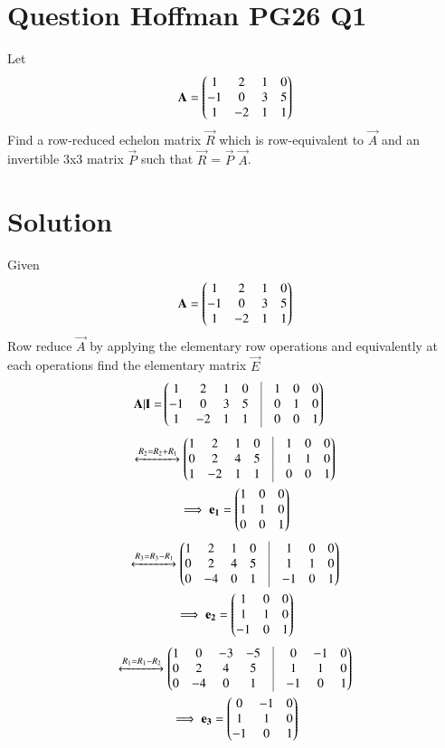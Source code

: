 \documentclass[journal,12pt,twocolumn]{IEEEtran}
\begin{document}
%
\section{Question Hoffman PG26 Q1 }
Let
\begin{align}
\mathbf{A}=\begin{pmatrix}1&2&1&0\\-1&0&3&5\\1&-2&1&1\end{pmatrix}  
\end{align}
Find a row-reduced echelon matrix $\vec{R}$ which is row-equivalent to $\vec{A}$ and an invertible 3x3 matrix $\vec{P}$ such that $\vec{R}$ = $\vec{P}$ $\vec{A}$.
\section{\textbf{Solution}}Given 
\begin{align}
\mathbf{A}=\begin{pmatrix}1&2&1&0\\-1&0&3&5\\1&-2&1&1\end{pmatrix}
\end{align}
Row reduce $\vec{A}$ by applying the elementary row operations and equivalently at each operations find the elementary matrix $\vec{E}$
\begin{align}
    \vec{A|I}=&\myvec{1&2&1&0&\vrule&1&0&0\\-1&0&3&5&\vrule&0&1&0\\1&-2&1&1&\vrule&0&0&1}
\end{align}
\begin{multline}
    \xleftrightarrow{R_2=R_2+R_1}\myvec{1&2&1&0&\vrule&1&0&0\\0&2&4&5&\vrule&1&1&0\\1&-2&1&1&\vrule&0&0&1}\\
    \implies\vec{e_1}=\myvec{1&0&0\\1&1&0\\0&0&1} 
\end{multline}
\begin{multline}
\xleftrightarrow{R_3=R_3-R_1}\myvec{1&2&1&0&\vrule&1&0&0\\0&2&4&5&\vrule&1&1&0\\0&-4&0&1&\vrule&-1&0&1}\\
\implies\vec{e_2}=\myvec{1&0&0\\1&1&0\\-1&0&1}
\end{multline}
\begin{multline}
\xleftrightarrow{R_1=R_1-R_2}\myvec{1&0&-3&-5&\vrule&0&-1&0\\0&2&4&5&\vrule&1&1&0\\0&-4&0&1&\vrule&-1&0&1}\\
\implies\vec{e_3}=\myvec{0&-1&0\\1&1&0\\-1&0&1}
\end{multline}
\end{document}
